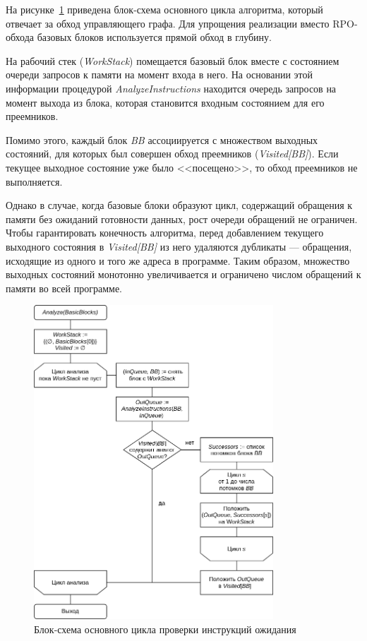 \documentclass[a4paper,14pt]{extarticle}
\begin{document}
{На рисунке~\ref{fig:diagram-waitcnt} приведена блок-схема основного цикла
алгоритма, который отвечает за обход управляющего графа. Для упрощения реализации
вместо RPO-обхода базовых блоков используется прямой обход в глубину.

На рабочий стек (\textit{WorkStack}) помещается базовый блок вместе с состоянием
очереди запросов к памяти на момент входа в него. На основании этой информации
процедурой \textit{AnalyzeInstructions} находится очередь запросов на момент
выхода из блока, которая становится входным состоянием для его преемников.

Помимо этого, каждый блок \textit{BB} ассоциируется с множеством выходных состояний,
для которых был совершен обход преемников (\textit{Visited[BB]}). Если текущее выходное
состояние уже было <<посещено>>, то обход преемников не выполняется.

Однако в случае, когда базовые блоки образуют цикл, содержащий обращения к памяти без ожиданий
готовности данных, рост очереди обращений не ограничен. Чтобы гарантировать конечность
алгоритма, перед добавлением текущего выходного состояния в \textit{Visited[BB]} из него
удаляются дубликаты — обращения, исходящие из одного и того же адреса в программе. Таким образом,
множество выходных состояний монотонно увеличивается и ограничено числом обращений к памяти
во всей программе.

\begin{figure}[H]
\centering
\includegraphics[width=0.8\textwidth]{diagrams/alg-waitcnt}
\caption{Блок-схема основного цикла проверки инструкций ожидания}
\label{fig:diagram-waitcnt}
\end{figure}

}
\end{document}
